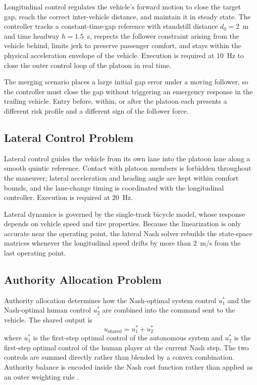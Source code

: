 \documentclass[12pt,a4paper,oneside]{report}
\begin{document}
Longitudinal control regulates the vehicle's forward motion to close the target gap,
reach the correct inter-vehicle distance, and maintain it in steady state. The controller
tracks a constant-time-gap reference with standstill distance $d_0 = 2$~m and time
headway $h = 1.5$~s, respects the follower constraint arising from the vehicle behind,
limits jerk to preserve passenger comfort, and stays within the physical acceleration
envelope of the vehicle. Execution is required at $10$~Hz to close the outer control
loop of the platoon in real time.

The merging scenario places a large initial gap error under a moving follower, so the
controller must close the gap without triggering an emergency response in the trailing
vehicle. Entry before, within, or after the platoon each presents a different risk
profile and a different sign of the follower force.

\subsection{Lateral Control Problem}

Lateral control guides the vehicle from its own lane into the platoon lane along a
smooth quintic reference. Contact with platoon members is forbidden throughout the
maneuver; lateral acceleration and heading angle are kept within comfort bounds, and
the lane-change timing is coordinated with the longitudinal controller. Execution is
required at $20$~Hz.

Lateral dynamics is governed by the single-track bicycle model, whose response depends
on vehicle speed and tire properties. Because the linearization is only accurate near
the operating point, the lateral Nash solver rebuilds the state-space matrices whenever
the longitudinal speed drifts by more than $2$~m/s from the last operating point.

\subsection{Authority Allocation Problem}

Authority allocation determines how the Nash-optimal system control $u_1^{*}$ and the
Nash-optimal human control $u_2^{*}$ are combined into the command sent to the vehicle.
The shared output is
\begin{equation}
u_{\text{shared}} = u_1^{*} + u_2^{*}
\label{eq:shared_control_intro}
\end{equation}
where $u_1^{*}$ is the first-step optimal control of the autonomous system and $u_2^{*}$
is the first-step optimal control of the human player at the current Nash step.
The two controls are summed directly rather than blended by a convex combination.
Authority balance is encoded inside the Nash cost function rather than applied as an
outer weighting rule \cite{pustilnikGeneralizedNashEquilibrium2025}.
\end{document}
